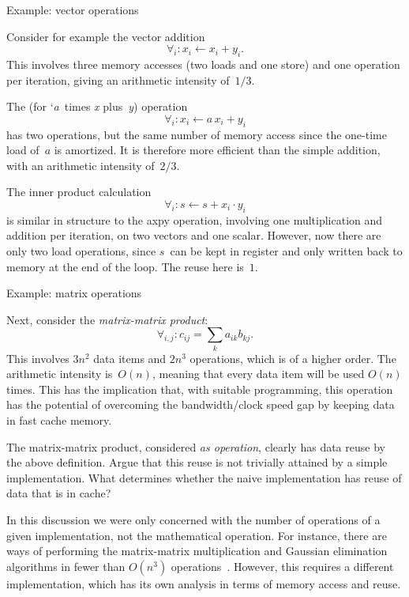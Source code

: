  {Example: vector operations}

Consider for example the vector addition 
\[ \forall_i\colon x_i\leftarrow x_i+y_i.
\]
This involves three memory accesses (two loads and one store) 
and one operation per iteration,
giving an arithmetic intensity of~$1/3$.

The   (for
`\emph{a}~times \emph{x} plus~\emph{y}) operation 
\[ \forall_i\colon x_i\leftarrow a\,x_i+ y_i
\]
has
two operations, but the same number of memory access since the
one-time load of~$a$ is amortized. It is therefore more efficient
than the simple addition, with an arithmetic intensity of~$2/3$.

The inner product calculation 
\[ \forall_i\colon s\leftarrow s+x_i\cdot y_i
\]
is similar in structure to the axpy operation, involving one
multiplication and addition per iteration, on two vectors and one
scalar. However, now there are only two load operations, since $s$~can
be kept in register and only written back to memory at the end of the
loop. The reuse here is~$1$.

 {Example: matrix operations}
\label{sec:mmp-example}

Next, consider the \emph{matrix-matrix product}:
\[ \forall_{i,j}\colon c_{ij} = \sum_k a_{ik}b_{kj}. \] This involves
$3n^2$ data items and $2n^3$ operations, which is of a
higher order. The arithmetic intensity is~$O(n)$, meaning that every data item
will be used $O(n)$ times.  This has the implication that, with
suitable programming, this operation has the potential of overcoming
the bandwidth/clock speed gap by keeping data in fast cache memory.

\begin{exercise}
  The matrix-matrix product, considered \emph{as operation}, clearly
  has data reuse by the above definition. Argue that this reuse is not
  trivially attained by a simple implementation. What determines
  whether the naive implementation has  reuse of data that is in cache?
\end{exercise}

In this discussion we were only concerned with the number of
operations of a given implementation, not the mathematical
operation. For instance, there are ways of performing the
matrix-matrix multiplication and Gaussian elimination algorithms in
fewer than $O(n^3)$
operations~\cite{St:gaussnotoptimal,Pa:combinations}. However, this
requires a different implementation, which has its own analysis in
terms of memory access and reuse.

